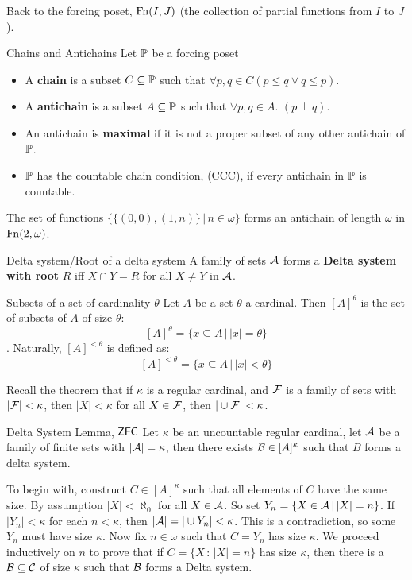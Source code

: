 \documentclass{article}
\begin{document}
Back to the forcing poset, $\operatorname{Fn}(I,J)$ (the collection of partial functions from $I$ to $J$).
\begin{fancydefine}{Chains and Antichains}
    Let $\mathbb{P}$ be a forcing poset \begin{itemize}
        \item A \textbf{chain} is a subset $C \subseteq \mathbb{P}$ such that $\forall p,q \in C (p \leq q \vee q \leq p)$.
        \item A \textbf{antichain} is a subset $A \subseteq \mathbb{P}$ such that $\forall p,q \in A. \,\, (p \perp q)$.
        \item An antichain is \textbf{maximal} if it is not a proper subset of any other antichain of $\mathbb{P}$.
        \item $\mathbb{P}$ has the countable chain condition, (CCC), if every antichain in $\mathbb{P}$ is countable.
    \end{itemize}
\end{fancydefine}
\begin{ex*}
    The set of functions $\{ \{(0,0), (1,n)\} \, | \, n \in \omega \}$ forms an antichain of length $\omega$ in $\operatorname{Fn}(2, \omega)$.
\end{ex*}
\begin{fancydefine}{Delta system/Root of a delta system}
    A family of sets $\mathcal{A}$ forms a \textbf{Delta system with root }$R$ iff $X \cap Y = R$ for all $X \neq Y$ in $\mathcal{A}$.
\end{fancydefine}
\begin{fancydefine}{Subsets of a set of cardinality $\theta$}
    Let $A$ be a set $\theta$ a cardinal. Then $[A]^{\theta}$ is the set of subsets of $A$ of size $\theta$: \[ [A]^{\theta} = \{ x \subseteq A \, | \, |x|=\theta\}\]. Naturally, $[A]^{<\theta}$ is defined as: \[[A]^{<\theta} = \{ x \subseteq A \, | \, |x|<\theta\}\]
\end{fancydefine}
Recall the theorem that if $\kappa$ is a regular cardinal, and $\mathcal{F}$ is a family of sets with $|\mathcal{F}|<\kappa$, then $|X|<\kappa$ for all $X \in \mathcal{F}$, then $|\cup \mathcal{F}| < \kappa$.
\begin{fancylem}{Delta System Lemma, $\mathsf{ZFC}$}
    Let $\kappa$ be an uncountable regular cardinal, let $\mathcal{A}$ be a family of finite sets with $|\mathcal{A}| = \kappa$, then there exists $\mathcal{B} \in [A]^{\kappa}$ such that $B$ forms a delta system.
\end{fancylem}
\proof To begin with, construct $C \in [A]^{\kappa}$ such that all elements of $C$ have the same size. By assumption $|X| < \aleph_{0}$ for all $X \in \mathcal{A}$. So set $Y_{n} = \{X \in \mathcal{A} \, | \, |X|=n\}$. If $|Y_{n}| < \kappa$ for each $n < \kappa$, then $|\mathcal{A}| = |\cup Y_{n}| < \kappa$. This is a contradiction, so some $Y_{n}$ must have size $\kappa$. \gap
Now fix $n \in \omega$ such that $C = Y_{n}$ has size $\kappa$. We proceed inductively on $n$ to prove that if $C = \{X \, : \, |X|=n\}$ has size $\kappa$, then there is a $\mathcal{B} \subseteq \mathcal{C}$ of size $\kappa$ such that $\mathcal{B}$ forms a Delta system.\\
\end{document}
